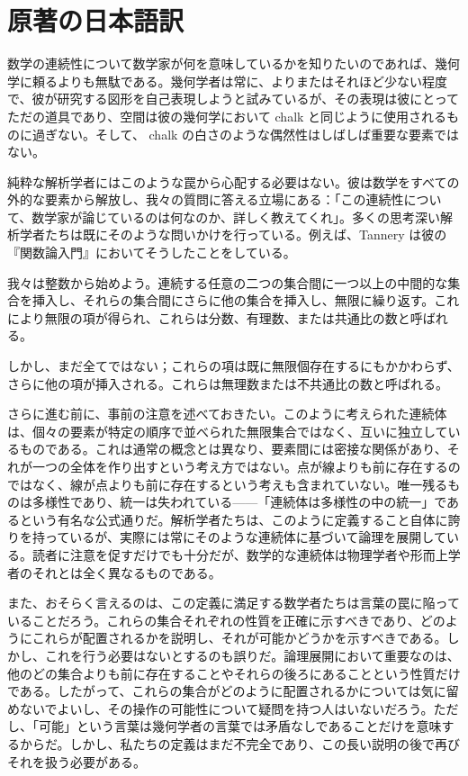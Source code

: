 \documentclass[a4paper,11pt,openany]{ltjsbook}
\begin{document}
\section{原著の日本語訳}
数学の連続性について数学家が何を意味しているかを知りたいのであれば、幾何学に頼るよりも無駄である。幾何学者は常に、よりまたはそれほど少ない程度で、彼が研究する図形を自己表現しようと試みているが、その表現は彼にとってただの道具であり、空間は彼の幾何学において chalk と同じように使用されるものに過ぎない。そして、 chalk の白さのような偶然性はしばしば重要な要素ではない。

純粋な解析学者にはこのような罠から心配する必要はない。彼は数学をすべての外的な要素から解放し、我々の質問に答える立場にある：「この連続性について、数学家が論じているのは何なのか、詳しく教えてくれ」。多くの思考深い解析学者たちは既にそのような問いかけを行っている。例えば、Tannery は彼の『関数論入門』においてそうしたことをしている。

我々は整数から始めよう。連続する任意の二つの集合間に一つ以上の中間的な集合を挿入し、それらの集合間にさらに他の集合を挿入し、無限に繰り返す。これにより無限の項が得られ、これらは分数、有理数、または共通比の数と呼ばれる。

しかし、まだ全てではない；これらの項は既に無限個存在するにもかかわらず、さらに他の項が挿入される。これらは無理数または不共通比の数と呼ばれる。

さらに進む前に、事前の注意を述べておきたい。このように考えられた連続体は、個々の要素が特定の順序で並べられた無限集合ではなく、互いに独立しているものである。これは通常の概念とは異なり、要素間には密接な関係があり、それが一つの全体を作り出すという考え方ではない。点が線よりも前に存在するのではなく、線が点よりも前に存在するという考えも含まれていない。唯一残るものは多様性であり、統一は失われている——「連続体は多様性の中の統一」であるという有名な公式通りだ。解析学者たちは、このように定義すること自体に誇りを持っているが、実際には常にそのような連続体に基づいて論理を展開している。読者に注意を促すだけでも十分だが、数学的な連続体は物理学者や形而上学者のそれとは全く異なるものである。

また、おそらく言えるのは、この定義に満足する数学者たちは言葉の罠に陥っていることだろう。これらの集合それぞれの性質を正確に示すべきであり、どのようにこれらが配置されるかを説明し、それが可能かどうかを示すべきである。しかし、これを行う必要はないとするのも誤りだ。論理展開において重要なのは、他のどの集合よりも前に存在することやそれらの後ろにあることという性質だけである。したがって、これらの集合がどのように配置されるかについては気に留めないでよいし、その操作の可能性について疑問を持つ人はいないだろう。ただし、「可能」という言葉は幾何学者の言葉では矛盾なしであることだけを意味するからだ。しかし、私たちの定義はまだ不完全であり、この長い説明の後で再びそれを扱う必要がある。
\end{document}
